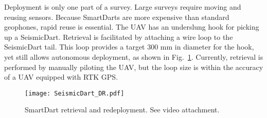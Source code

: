 Deployment is only one part of a survey. Large surveys require moving and reusing sensors.  
Because SmartDarts are more expensive than standard geophones, rapid reuse is essential.
The UAV has an underslung hook for picking up a SeismicDart.
Retrieval is facilitated by attaching a wire loop to the SeismicDart tail.
 This loop provides a target 300 mm in diameter for the hook, yet still allows autonomous deployment, as shown in Fig.~\ref{fig:SeismicDart_DR}.
Currently, retrieval is performed by manually piloting the UAV, but the loop size is within the accuracy of a UAV equipped with RTK GPS.



\begin{figure} \centering
  {\texttt{[image: SeismicDart\_DR.pdf]}}
 \caption{SmartDart retrieval and redeployment.  See video attachment. 
 \label{fig:SeismicDart_DR}}
\end{figure}
 
